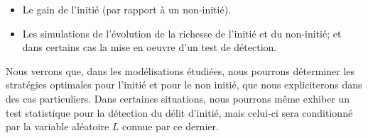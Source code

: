 \documentclass[../finalreport.tex]{subfiles}
\begin{document}
\vspace{5mm}

\begin{itemize}
\item Le gain de l'initié (par rapport à un non-initié).
\item Les simulations de l'évolution de la richesse de l'initié et du non-initié; et dans certains cas la mise en oeuvre d'un test de détection.
\end{itemize}

\vspace{5mm}

\par Nous verrons que, dans les modélisations étudiées, nous pourrons déterminer les stratégies optimales pour l'initié et pour le non initié, que nous expliciterons dans des cas particuliers. Dans certaines situations, nous pourrons même exhiber un test statistique pour la détection du délit d'initié, mais celui-ci sera conditionné par la variable aléatoire $L$ connue par ce dernier.
\end{document}
